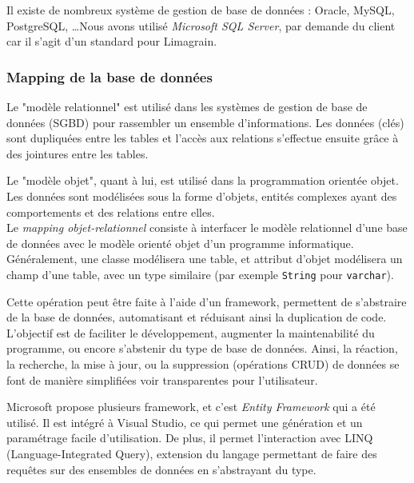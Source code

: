 Il existe de nombreux système de gestion de base de données : Oracle, MySQL, PostgreSQL, \ldots Nous avons utilisé \textit{Microsoft SQL Server}, par demande du client car il s'agit d'un standard pour Limagrain.


\subsubsection{Mapping de la base de données}


Le "modèle relationnel" est utilisé dans les systèmes de gestion de base de données (SGBD) pour rassembler un ensemble d'informations.
Les données (clés) sont dupliquées entre les tables et l'accès aux relations s'effectue ensuite grâce à des jointures entre les tables.

Le "modèle objet", quant à lui, est utilisé dans la programmation orientée objet.
Les données sont modélisées sous la forme d'objets, entités complexes ayant des comportements et des relations entre elles.
\\

Le \textit{mapping objet-relationnel} consiste à interfacer le modèle relationnel d'une base de données avec le modèle orienté objet d'un programme informatique.
Généralement, une classe modélisera une table, et attribut d'objet modélisera un champ d'une table, avec un type similaire (par exemple \lstinline{String} pour \lstinline{varchar}).



Cette opération peut être faite à l'aide d'un framework, permettent de s'abstraire de la base de données, automatisant et réduisant ainsi la duplication de code.
L'objectif est de faciliter le développement, augmenter la maintenabilité du programme, ou encore s'abstenir du type de base de données.
Ainsi, la réaction, la recherche, la mise à jour, ou la suppression (opérations CRUD) de données se font de manière simplifiées voir transparentes pour l'utilisateur.

Microsoft propose plusieurs framework, et c'est \textit{Entity Framework} qui a été utilisé.
Il est intégré à Visual Studio, ce qui permet une génération et un paramétrage facile d'utilisation.
De plus, il permet l'interaction avec  LINQ (Language-Integrated Query), extension du langage permettant de faire des requêtes sur des ensembles de données en s'abstrayant du type.

